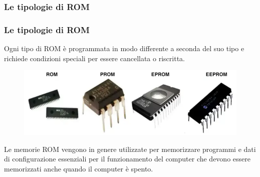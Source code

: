\subsubsection[Le tipologie di ROM]{Le tipologie di ROM}
\begin{frame}
	\frametitle{Le tipologie di ROM}
	  
	\begin{block}{}
		
		Ogni tipo di ROM è programmata in modo differente a seconda del suo tipo e richiede condizioni speciali per essere cancellata o riscritta.
		
		\begin{figure}[!htbp] 
			\centering
			\includegraphics[width=0.80\linewidth]{images/5_memory/roms.png}
		\end{figure}
		
		Le  memorie ROM vengono in genere utilizzate per memorizzare programmi e dati di configurazione essenziali per il funzionamento del computer che devono essere memorizzati anche quando il computer è spento.
	\end{block}
	
\end{frame}


